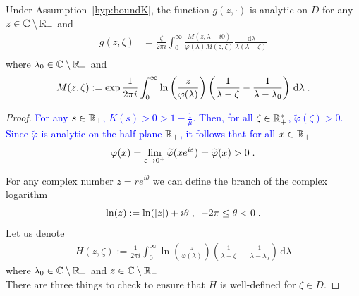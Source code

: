 \documentclass[11pt]{amsart}
\newcommand{\blue}[1]{\textcolor{blue}{#1}}
\newcommand{\diff}{\,\mathrm{d}}
\begin{document}
\begin{theorem}
Under Assumption~\ref{hyp:boundK}, the function $g(z, \cdot)$ is analytic on $D$ for any $z \in \mathbb{C} \setminus \mathbb{R}_-$ and
\begin{align*}
    g(z,\zeta) 
    &= 
    \frac{\zeta}{2\pi i}\int_0^\infty  \frac{M(z,\lambda-i0)}{\varphi(\lambda)M(z,\zeta)} \frac{\diff \lambda}{\lambda(\lambda-\zeta)} \\
\end{align*}
where $\lambda_0 \in \mathbb{C} \setminus \mathbb{R}_+$ and 
$$ M(z, \zeta) := \exp{\frac{1}{2\pi i }\int_0^\infty \ln\left(\frac{z}{\varphi(\lambda)}\right) \left( \frac{1}{\lambda-\zeta} - \frac{1}{\lambda-\lambda_0}\right) \diff \lambda} \eqfinp$$ 
\end{theorem}
\begin{proof}
\blue{For any $s \in \mathbb{R}_+$, $K(s) > 0 > 1 - \frac1\mu$. Then, 
for all $\zeta \in \mathbb{R}_+^*$, $\tilde \varphi(\zeta) > 0$.
Since $\tilde \varphi$ is analytic on the half-plane $\mathbb{R}_+$, it follows that for all $x \in \mathbb{R}_+$ 
    $$\varphi(x) = \lim_{\varepsilon \to 0^+} \widetilde \varphi(xe^{i\varepsilon}) = \widetilde \varphi(x) > 0 \; .$$
}

For any complex number $z = re^{i\theta}$ we can define the branch of the complex logarithm
$$\ln(z) := \ln(|z|) + i\theta \; , \enspace -2\pi \leq \theta < 0  \; .$$
Let us denote
    \begin{align*}
        H(z,\zeta) := \frac{1}{2\pi i }\int_0^\infty \ln\left(\frac{z}{\varphi(\lambda)}\right) \left( \frac{1}{\lambda-\zeta} - \frac{1}{\lambda-\lambda_0}\right) \diff \lambda
    \end{align*}
where $\lambda_0 \in \mathbb{C} \setminus \mathbb{R}_+$ and \blue{$z \in \mathbb{C} \setminus \mathbb{R}_-$}\\

There are three things to check to ensure that $H$ is well-defined for $\zeta \in D$. 


\end{proof}
\end{document}
